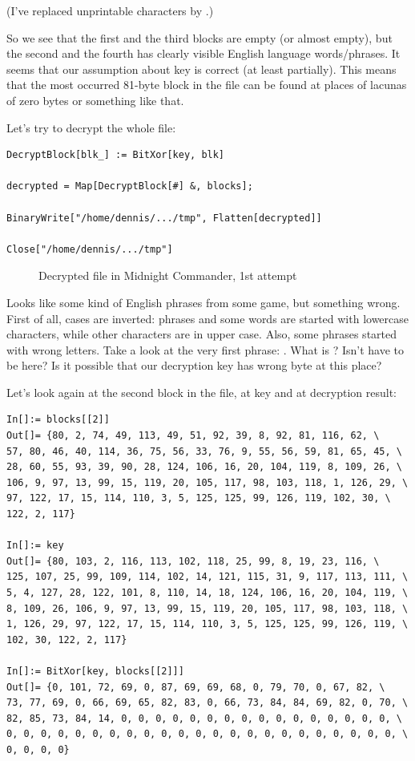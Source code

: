 (I've replaced unprintable characters by .)

So we see that the first and the third blocks are empty (or almost empty),
but the second and the fourth has clearly visible English language words/phrases.
It seems that our assumption about key is correct (at least partially).
This means that the most occurred 81-byte block in the file can be found at places of lacunas
of zero bytes or something like that.

Let's try to decrypt the whole file:

\begin{lstlisting}[style=custommath]
DecryptBlock[blk_] := BitXor[key, blk]

decrypted = Map[DecryptBlock[#] &, blocks];

BinaryWrite["/home/dennis/.../tmp", Flatten[decrypted]]

Close["/home/dennis/.../tmp"]
\end{lstlisting}

\begin{figure}[H]
\centering
{}
\caption{Decrypted file in Midnight Commander, 1st attempt}
\end{figure}

Looks like some kind of English phrases from some game, but something wrong.
First of all, cases are inverted: phrases and some words are started with lowercase characters,
while other characters are in upper case.
Also, some phrases started with wrong letters.
Take a look at the very first phrase: .
What is ? Isn't  have to be here?
Is it possible that our decryption key has wrong byte at this place?

Let's look again at the second block in the file, at key and at decryption result:

\begin{lstlisting}[style=custommath]
In[]:= blocks[[2]]
Out[]= {80, 2, 74, 49, 113, 49, 51, 92, 39, 8, 92, 81, 116, 62, \
57, 80, 46, 40, 114, 36, 75, 56, 33, 76, 9, 55, 56, 59, 81, 65, 45, \
28, 60, 55, 93, 39, 90, 28, 124, 106, 16, 20, 104, 119, 8, 109, 26, \
106, 9, 97, 13, 99, 15, 119, 20, 105, 117, 98, 103, 118, 1, 126, 29, \
97, 122, 17, 15, 114, 110, 3, 5, 125, 125, 99, 126, 119, 102, 30, \
122, 2, 117}

In[]:= key
Out[]= {80, 103, 2, 116, 113, 102, 118, 25, 99, 8, 19, 23, 116, \
125, 107, 25, 99, 109, 114, 102, 14, 121, 115, 31, 9, 117, 113, 111, \
5, 4, 127, 28, 122, 101, 8, 110, 14, 18, 124, 106, 16, 20, 104, 119, \
8, 109, 26, 106, 9, 97, 13, 99, 15, 119, 20, 105, 117, 98, 103, 118, \
1, 126, 29, 97, 122, 17, 15, 114, 110, 3, 5, 125, 125, 99, 126, 119, \
102, 30, 122, 2, 117}

In[]:= BitXor[key, blocks[[2]]]
Out[]= {0, 101, 72, 69, 0, 87, 69, 69, 68, 0, 79, 70, 0, 67, 82, \
73, 77, 69, 0, 66, 69, 65, 82, 83, 0, 66, 73, 84, 84, 69, 82, 0, 70, \
82, 85, 73, 84, 14, 0, 0, 0, 0, 0, 0, 0, 0, 0, 0, 0, 0, 0, 0, 0, 0, \
0, 0, 0, 0, 0, 0, 0, 0, 0, 0, 0, 0, 0, 0, 0, 0, 0, 0, 0, 0, 0, 0, 0, \
0, 0, 0, 0}
\end{lstlisting}

